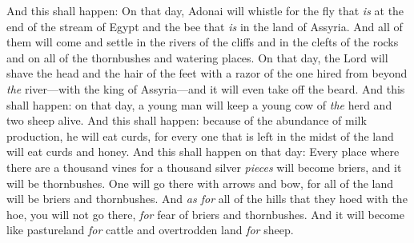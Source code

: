 \begin{biblechapter}
\verse And this shall happen: On that day, Adonai will whistle for the fly that \textit{is} at the end of the stream of Egypt and the bee that \textit{is} in the land of Assyria.
\verse And all of them will come and settle in the rivers of the cliffs and in the clefts of the rocks and on all of the thornbushes and watering places.
\verse On that day, the Lord will shave the head and the hair of the feet with a razor of the one hired from beyond \textit{the} river—with the king of Assyria—and it will even take off the beard.
\verse And this shall happen: on that day, a young man will keep a young cow of \textit{the} herd and two sheep alive.
\verse And this shall happen: because of the abundance of milk production, he will eat curds, for every one that is left in the midst of the land will eat curds and honey.
\verse And this shall happen on that day: Every place where there are a thousand vines for a thousand silver \textit{pieces} will become briers, and it will be thornbushes.
\verse One will go there with arrows and bow, for all of the land will be briers and thornbushes.
\verse And \textit{as for} all of the hills that they hoed with the hoe, you will not go there, \textit{for} fear of briers and thornbushes. And it will become like pastureland \textit{for} cattle and overtrodden land \textit{for} sheep.
\end{biblechapter}

